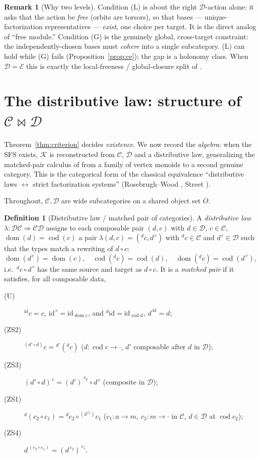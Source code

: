\documentclass[11pt]{article}
\theoremstyle{definition}
\newtheorem{definition}[theorem]{Definition}
\newtheorem{remark}[theorem]{Remark}
\newcommand{\id}{\mathrm{id}}
\newcommand{\C}{\mathcal{C}}
\newcommand{\D}{\mathcal{D}}
\newcommand{\K}{\mathcal{K}}
\newcommand{\E}{\mathcal{E}}
\newcommand{\dom}{\operatorname{dom}}
\newcommand{\cod}{\operatorname{cod}}
\newcommand{\lact}[2]{{}^{#1}\!#2}      %
\newcommand{\rest}[2]{#1^{\,#2}}        %
\begin{document}
\begin{remark}[Why two levels]
Condition (L) is about the right $\D$-action alone: it asks that the action be
\emph{free} (orbits are torsors), so that bases --- unique-factorization
representatives --- \emph{exist}, one choice per target. It is the direct analog
of ``free module.'' Condition (G) is the genuinely global, cross-target
constraint: the independently-chosen bases must \emph{cohere} into a single
subcategory. (L) can hold while (G) fails (Proposition~\ref{prop:ce}); the gap is
a holonomy class. When $\D=\E$ this is exactly the local-freeness / global-closure
split of \cite{single}.
\end{remark}

\section{The distributive law: structure of $\C\bowtie\D$}

Theorem~\ref{thm:criterion} decides \emph{existence}. We now record the
\emph{algebra}: when the SFS exists, $\K$ is reconstructed from $\C$, $\D$ and a
distributive law, generalizing the matched-pair calculus of \cite{single} from a
family of vertex monoids to a second genuine category. This is the
categorical form of the classical equivalence ``distributive laws $\leftrightarrow$
strict factorization systems'' (Rosebrugh--Wood \cite{rw}, Street \cite{street}).

Throughout, $\C,\D$ are wide subcategories on a shared object set $O$.

\begin{definition}[Distributive law / matched pair of categories]\label{def:law}
A \emph{distributive law} $\lambda:\D\C\Rightarrow\C\D$ assigns to each composable
pair $(d,c)$ with $d\in\D$, $c\in\C$, $\dom(d)=\cod(c)$ a pair
$\lambda(d,c)=(\lact{d}{c},\rest{d}{c})$ with $\lact{d}{c}\in\C$ and
$\rest{d}{c}\in\D$ such that the types match a rewriting of $d\circ c$:
\[
  \dom(\rest{d}{c})=\dom(c),\quad \cod(\lact{d}{c})=\cod(d),\quad
  \dom(\lact{d}{c})=\cod(\rest{d}{c}),
\]
i.e.\ $\lact{d}{c}\circ\rest{d}{c}$ has the same source and target as
$d\circ c$. It is a \emph{matched pair} if it satisfies, for all composable data,
\begin{description}
\item[(U)] $\lact{\id}{c}=c,\ \rest{\id}{c}=\id_{\dom c}$, and
$\lact{d}{\id}=\id_{\cod d},\ \rest{d}{\id}=d$;
\item[(ZS2)] $\lact{(d'\circ d)}{c}=\lact{d'}{(\lact{d}{c})}$\quad
($d:\cod c\to\cdot$, $d'$ composable after $d$ in $\D$);
\item[(ZS3)] $\rest{(d'\circ d)}{c}=\rest{(d')}{\,\lact{d}{c}}\circ\rest{d}{c}$\quad
(composite in $\D$);
\item[(ZS1)] $\lact{d}{(c_2\circ c_1)}
=\lact{d}{c_2}\circ\lact{(\rest{d}{c_2})}{c_1}$\quad
($c_1:a\to m,\ c_2:m\to\cdot$ in $\C$, $d\in\D$ at $\cod c_2$);
\item[(ZS4)] $\rest{d}{(c_2\circ c_1)}=\rest{(\rest{d}{c_2})}{c_1}$.
\end{description}
\end{definition}
\end{document}
